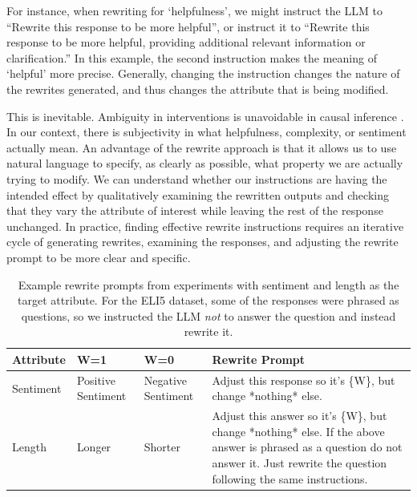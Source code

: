 \documentclass{article}
\begin{document}
For instance, when rewriting for `helpfulness', we might instruct the LLM to ``Rewrite this response to be more helpful'', or instruct it to ``Rewrite this response to be more helpful, providing additional relevant information or clarification.''
In this example, the second instruction makes the meaning of `helpful' more precise. Generally, changing the instruction changes the nature of the rewrites generated, and thus changes the attribute that is being modified.

This is inevitable. Ambiguity in interventions is unavoidable in causal inference \citep{hernan2016does}. In our context, there is subjectivity in what helpfulness, complexity, or sentiment actually mean.
An advantage of the rewrite approach is that it allows us to use natural language to specify, as clearly as possible, what property we are actually trying to modify. We can understand whether our instructions are having the intended effect by qualitatively examining the rewritten outputs and checking that they vary the attribute of interest while leaving the rest of the response unchanged.
In practice, finding effective rewrite instructions requires an iterative cycle of generating rewrites, examining the responses, and adjusting the rewrite prompt to be more clear and specific.

\begin{table}[t]
  \centering
  \small
  \renewcommand{\arraystretch}{1.25}
  \begin{tabular}{|p{1.5cm}|p{2.5cm}|p{2.5cm}|p{4cm}|}
  \hline
  \textbf{Attribute} & \textbf{W=1} & \textbf{W=0} & \textbf{Rewrite Prompt} \\
  \hline
  Sentiment & Positive Sentiment & Negative Sentiment & Adjust this response so it's \{W\}, but change *nothing* else. \\
  \hline
  Length & Longer & Shorter & Adjust this answer so it's \{W\}, but change *nothing* else. If the above answer is phrased as a question do not answer it. Just rewrite the question following the same instructions. \\
  \hline
  \end{tabular}
  \caption{Example rewrite prompts from experiments with sentiment and length as the target attribute. For the ELI5 dataset, some of the responses were phrased as questions, so we instructed the LLM \emph{not} to answer the question and instead rewrite it.}
  \label{tab:rewrite_prompts}
\end{table}
\end{document}
